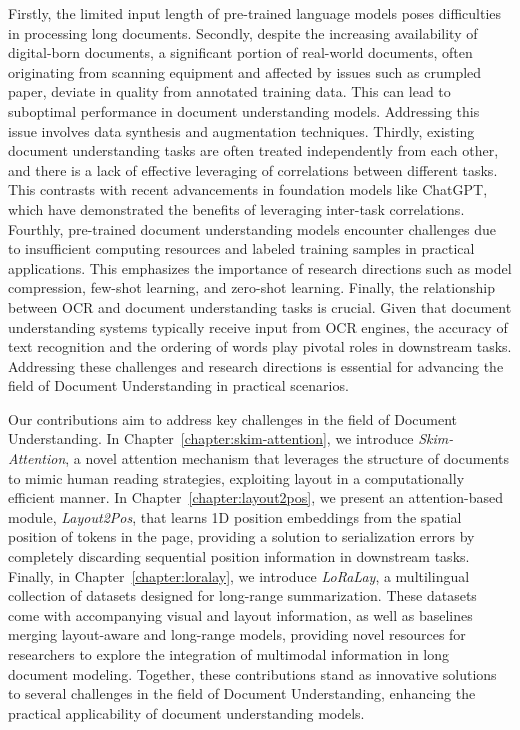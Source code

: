 Firstly, the limited input length of pre-trained language models poses difficulties in processing long documents. Secondly, despite the increasing availability of digital-born documents, a significant portion of real-world documents, often originating from scanning equipment and affected by issues such as crumpled paper, deviate in quality from annotated training data. This can lead to suboptimal performance in document understanding models. Addressing this issue involves data synthesis and augmentation techniques. Thirdly, existing document understanding tasks are often treated independently from each other, and there is a lack of effective leveraging of correlations between different tasks. This contrasts with recent advancements in foundation models like ChatGPT, which have demonstrated the benefits of leveraging inter-task correlations. Fourthly, pre-trained document understanding models encounter challenges due to insufficient computing resources and labeled training samples in practical applications. This emphasizes the importance of research directions such as model compression, few-shot learning, and zero-shot learning. Finally, the relationship between \ac{OCR} and document understanding tasks is crucial. Given that document understanding systems typically receive input from \ac{OCR} engines, the accuracy of text recognition and the ordering of words play pivotal roles in downstream tasks. Addressing these challenges and research directions is essential for advancing the field of Document Understanding in practical scenarios.

Our contributions aim to address key challenges in the field of Document Understanding. In Chapter~\ref{chapter:skim-attention}, we introduce \textit{Skim-Attention}, a novel attention mechanism that leverages the structure of documents to mimic human reading strategies, exploiting layout in a computationally efficient manner. In Chapter~\ref{chapter:layout2pos}, we present an attention-based module, \textit{Layout2Pos}, that learns 1D position embeddings from the spatial position of tokens in the page, providing a solution to serialization errors by completely discarding sequential position information in downstream tasks. Finally, in Chapter~\ref{chapter:loralay}, we introduce \textit{LoRaLay}, a multilingual collection of datasets designed for long-range summarization. These datasets come with accompanying visual and layout information, as well as baselines merging layout-aware and long-range models, providing novel resources for researchers to explore the integration of multimodal information in long document modeling. Together, these contributions stand as innovative solutions to several challenges in the field of Document Understanding, enhancing the practical applicability of document understanding models.


\acresetall
